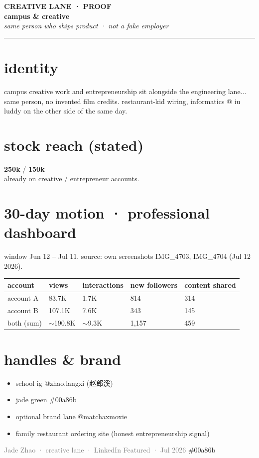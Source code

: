 \documentclass[11pt,letterpaper]{article}
\begin{document}
{\color{jade}\footnotesize\bfseries CREATIVE LANE · PROOF}\\[0.4em]
{\color{jade}\LARGE\bfseries campus \& creative}\\[0.25em]
{\large\itshape same person who ships product · not a fake employer}\\[0.5em]
{\color{jade}\rule{\textwidth}{1.4pt}}

\section*{identity}
campus creative work and entrepreneurship sit alongside the engineering lane...
same person, no invented film credits. restaurant-kid wiring, informatics @ iu luddy on the other side of the same day.

\section*{stock reach (stated)}
{\color{jade}\Huge\bfseries 250k} / {\color{jade}\Huge\bfseries 150k}\\[0.2em]
already on creative / entrepreneur accounts.

\section*{30-day motion · professional dashboard}
window Jun 12 -- Jul 11. source: own screenshots IMG\_4703, IMG\_4704 (Jul 12 2026).

\begin{tabular}{@{}lllll@{}}
\toprule
account & views & interactions & new followers & content shared \\
\midrule
account A & 83.7K & 1.7K & 814 & 314 \\
account B & 107.1K & 7.6K & 343 & 145 \\
\midrule
both (sum) & $\sim$190.8K & $\sim$9.3K & 1{,}157 & 459 \\
\bottomrule
\end{tabular}

\section*{handles \& brand}
\begin{itemize}
\item school ig @zhao.langxi (赵郎溪)
\item jade green \#00a86b
\item optional brand lane @matchaxmoxie
\item family restaurant ordering site (honest entrepreneurship signal)
\end{itemize}

\vspace*{\fill}
\noindent\textcolor{gray}{\footnotesize Jade Zhao · creative lane · LinkedIn Featured · Jul 2026}
\hfill\textcolor{jade}{\footnotesize \#00a86b}
\end{document}
